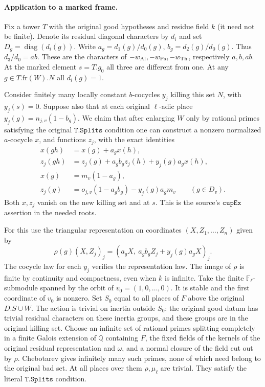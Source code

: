 \paragraph{Application to a marked frame.}
Fix a tower \(T\) with the original good hypotheses and residue
field \(k\) (it need not be finite). Denote its residual diagonal
characters by \(d_i\) and set \(D_g=\operatorname{diag}(d_i(g))\).
Write \(a_g=d_1(g)/d_0(g)\), \(b_g=d_2(g)/d_0(g)\).
Thus \(d_3/d_0=ab\). These are the characters of
\(-w_{\rm Al},-w_{\rm Ps},-w_{\rm Th}\), respectively \(a,b,ab\).
At the marked element \(s=T.g_0\) all three are different
from one. At any \(g\in T.\mathrm{fr}(W).N\) all \(d_i(g)=1\).

Consider finitely many locally constant \(b\)-cocycles \(y_j\)
killing this set \(N\), with \(y_j(s)=0\). Suppose also that at
each original \(\ell\)-adic place \(y_j(g)=n_{j,v}(1-b_g)\).
We claim that after enlarging \(W\) only by rational primes
satisfying the original \(\texttt{T.Splits}\) condition one can
construct a nonzero normalized \(a\)-cocycle \(x\), and functions
\(z_j\), with the exact identities
\[
\begin{split}
 x(gh)&=x(g)+a_gx(h),\\
 z_j(gh)&=z_j(g)+a_gb_gz_j(h)+y_j(g)a_gx(h),\\
 x(g)&=m_v(1-a_g),\\
 z_j(g)&=o_{j,v}(1-a_gb_g)-y_j(g)a_gm_v
       \qquad(g\in D_v).
\end{split}
\tag{2}
\]
Both \(x,z_j\) vanish on the new killing set and at \(s\).
This is the source's \(\texttt{cupEx}\) assertion in the
needed roots.

For this use the triangular representation on coordinates
\((X,Z_1,\ldots,Z_n)\) given by
\[
 \rho(g)(X,Z_j)_j=(a_gX,\ a_gb_gZ_j+y_j(g)a_gX)_j.
\]
The cocycle law for each \(y_j\) verifies the representation
law. The image of \(\rho\) is finite by continuity and
compactness, even when \(k\) is infinite. Take the finite
\(\mathbb F_\ell\)-submodule spanned by the orbit of
\(v_0=(1,0,\ldots,0)\). It is stable and the first coordinate
of \(v_0\) is nonzero. Set \(S_0\) equal to all places of
\(F\) above the original \(D.S\cup W\).
The action is trivial on inertia outside \(S_0\):
the original good datum has trivial residual characters
on these inertia groups, and these groups are in the original
killing set. Choose an infinite set of rational primes
splitting completely in a finite Galois extension of
\(\mathbb Q\) containing \(F\), the fixed fields of the
kernels of the original residual representation and
\(\omega\), and a normal closure of the field cut out by
\(\rho\). Chebotarev gives infinitely many such primes, none
of which need belong to the original bad set. At all places
over them \(\rho,\mu_\ell\) are trivial. They satisfy the
literal \(\texttt{T.Splits}\) condition.

